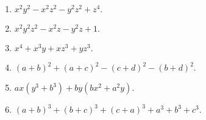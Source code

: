 \documentclass[a4paper,12pt]{article}
\begin{document}
\begin{multicols}{2}
\begin{enumerate}
\item $x ^ { 2 } y ^ { 2 } - x ^ { 2 } z ^ { 2 } - y ^ { 2 } z ^ { 2 } + z ^ { 4 } .$

\item $x ^ { 2 } y ^ { 2 } z ^ { 2 } - x ^ { 2 } z - y ^ { 2 } z + 1 .$

\item $x ^ { 4 } + x ^ { 3 } y + x z ^ { 3 } + y z ^ { 3 } .$

\item $( a + b ) ^ { 2 } + ( a + c ) ^ { 2 } - ( c + d ) ^ { 2 } - ( b + d ) ^ { 2 } .$

\item $a x ( y ^ { 3 } + b ^ { 3 } ) + b y ( b x ^ { 2 } + a ^ { 2 } y ) .$

\item $( a + b ) ^ { 3 } + ( b + c ) ^ { 3 } + ( c + a ) ^ { 3 } + a ^ { 3 } + b ^ { 3 } + c ^ { 3 } .$
\end{enumerate}
\end{multicols}
\end{document}

